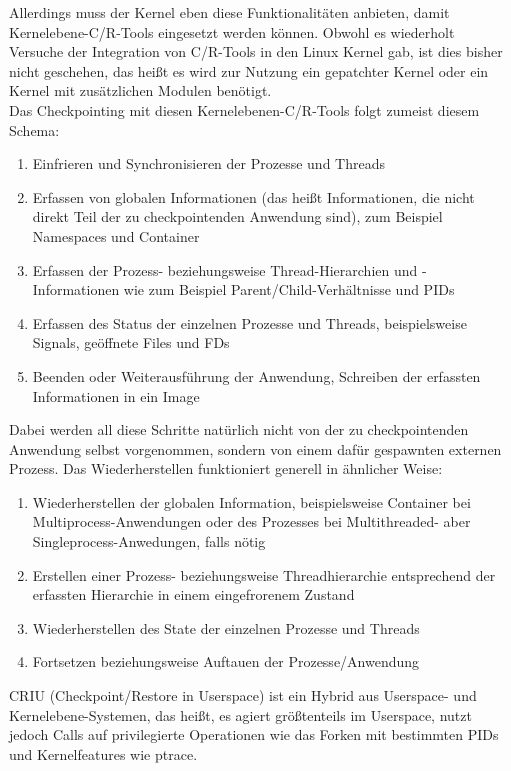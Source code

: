 \documentclass[a4paper]{article}
\begin{document}
Allerdings muss der Kernel eben diese Funktionalitäten anbieten, damit Kernelebene-C/R-Tools eingesetzt werden können. Obwohl es wiederholt Versuche der Integration von C/R-Tools in den Linux Kernel gab, ist dies bisher nicht geschehen, das heißt es wird zur Nutzung ein gepatchter Kernel oder ein Kernel mit zusätzlichen Modulen benötigt.\\
Das Checkpointing mit diesen Kernelebenen-C/R-Tools folgt zumeist diesem Schema:
\begin{enumerate}
    \item Einfrieren und Synchronisieren der Prozesse und Threads
    \item Erfassen von globalen Informationen (das heißt Informationen, die nicht direkt Teil der zu checkpointenden Anwendung sind), zum Beispiel Namespaces und Container
    \item Erfassen der Prozess- beziehungsweise Thread-Hierarchien und -Informationen wie zum Beispiel Parent/Child-Verhältnisse und PIDs
    \item Erfassen des Status der einzelnen Prozesse und Threads, beispielsweise Signals, geöffnete Files und FDs
    \item Beenden oder Weiterausführung der Anwendung, Schreiben der erfassten Informationen in ein Image
\end{enumerate}
Dabei werden all diese Schritte natürlich nicht von der zu checkpointenden Anwendung selbst vorgenommen, sondern von einem dafür gespawnten externen Prozess. Das Wiederherstellen funktioniert generell in ähnlicher Weise:
\begin{enumerate}
    \item Wiederherstellen der globalen Information, beispielsweise Container bei Multiprocess-Anwendungen oder des Prozesses bei Multithreaded- aber Singleprocess-Anwedungen, falls nötig
    \item Erstellen einer Prozess- beziehungsweise Threadhierarchie entsprechend der erfassten Hierarchie in einem eingefrorenem Zustand
    \item Wiederherstellen des State der einzelnen Prozesse und Threads
    \item Fortsetzen beziehungsweise Auftauen der Prozesse/Anwendung
\end{enumerate}
CRIU\cite{CRIU} (Checkpoint/Restore in Userspace) ist ein Hybrid aus Userspace- und Kernelebene-Systemen, das heißt, es agiert größtenteils im Userspace, nutzt jedoch Calls auf privilegierte Operationen wie das Forken mit bestimmten PIDs und Kernelfeatures wie ptrace.
\end{document}
